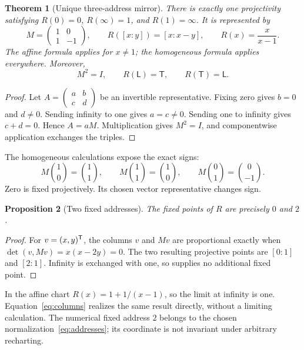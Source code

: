 \documentclass[11pt]{article}
\newtheorem{theorem}{Theorem}[section]
\newtheorem{proposition}[theorem]{Proposition}
\theoremstyle{definition}\newtheorem{definition}[theorem]{Definition}
\begin{document}
\begin{theorem}[Unique three-address mirror]
There is exactly one projectivity satisfying $R(0)=0$, $R(\infty)=1$, and $R(1)=\infty$. It is represented by
\begin{equation}
 M=\begin{pmatrix}1&0\\1&-1\end{pmatrix},\qquad
 R([x:y])=[x:x-y],\qquad R(x)=\frac{x}{x-1}.
 \label{eq:mirror}
\end{equation}
The affine formula applies for $x\ne1$; the homogeneous formula applies everywhere. Moreover,
\begin{equation}
 M^2=I,\qquad R(\mathsf L)=\mathsf T,\qquad R(\mathsf T)=\mathsf L.
 \label{eq:triple}
\end{equation}
\end{theorem}
\begin{proof}
Let $A=\left(\begin{smallmatrix}a&b\\c&d\end{smallmatrix}\right)$ be an invertible representative. Fixing zero gives $b=0$ and $d\ne0$. Sending infinity to one gives $a=c\ne0$. Sending one to infinity gives $c+d=0$. Hence $A=aM$. Multiplication gives $M^2=I$, and componentwise application exchanges the triples.
\end{proof}

The homogeneous calculations expose the exact signs:
\begin{equation}
 M\binom10=\binom11,\qquad
 M\binom11=\binom10,\qquad
 M\binom01=\binom0{-1}.
 \label{eq:columns}
\end{equation}
Zero is fixed projectively. Its chosen vector representative changes sign.

\begin{proposition}[Two fixed addresses]
The fixed points of $R$ are precisely $0$ and $2$.
\end{proposition}
\begin{proof}
For $v=(x,y)^\mathsf T$, the columns $v$ and $Mv$ are proportional exactly when
$\det(v,Mv)=x(x-2y)=0$. The two resulting projective points are $[0:1]$ and $[2:1]$. Infinity is exchanged with one, so supplies no additional fixed point.
\end{proof}

In the affine chart $R(x)=1+1/(x-1)$, so the limit at infinity is one. Equation~\eqref{eq:columns} realizes the same result directly, without a limiting calculation. The numerical fixed address $2$ belongs to the chosen normalization~\eqref{eq:addresses}; its coordinate is not invariant under arbitrary recharting.
\end{document}
